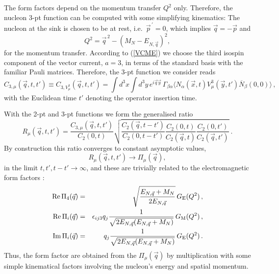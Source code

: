 \documentclass[11pt,prd,aps,showpacs,eqsecnum,floatfix,nofootinbib,preprint,tightenlines]{revtex4}
\newcommand{\pref}[1]{(\ref{#1})}
\newcommand{\GE}{G_{\rm E}}
\newcommand{\GM}{G_{\rm M}}
\begin{document}
The form factors depend on the momentum transfer $Q^2$ only. Therefore, the nucleon 3-pt function can be  computed with some simplifying kinematics: The nucleon at the sink is chosen to be at rest, i.e.\ $\vec{p}^{\,\prime}=0$, which implies $\vec{q}=-\vec{p}$ and 
\begin{equation}\label{DefQsqr}
Q^2=\vec{q}^{\,2} - (M_N-E_{N,\vec{q}})^2,
\end{equation}
for the momentum transfer. According to \pref{VCME}  we choose the third isospin component of the vector current, $a=3$, in terms of the standard basis with the familiar Pauli matrices. Therefore, the 3-pt function we consider reads
\begin{equation}\label{Def3ptfunc}
C_{3,{\mu}}(\vec{q},t,t')\equiv C_{3,V^3_{\mu}}(\vec{q},t,t')=\int d^3x\int d^3y \,e^{i\vec{q}\vec{y}}\, \Gamma_{\beta\alpha}\langle N_{\alpha}(\vec{x},t) V_{\mu}^3(\vec{y},t')\overline{N}_{\beta}(0,0)\rangle\,,
\end{equation}
with the Euclidean time $t'$ denoting the operator insertion time.

With the 2-pt and 3-pt functions we form the generalised ratio
\begin{equation}\label{DefRatio}
R_{\mu}(\vec{q},t,t') =\frac{C_{3,{\mu}}(\vec{q},t,t')}{C_2(0,t)}\sqrt{\frac{C_2(\vec{q},t-t')}{C_2(0,t-t')}\frac{C_2(0,t)}{C_2(\vec{q},t)}\frac{C_2(0,t')}{C_2(\vec{q},t')}} \ .
\end{equation}
By construction this ratio converges to constant asymptotic values,
\begin{equation}\label{Pimu}
R_{\mu}(\vec{q},t,t')  \longrightarrow \Pi_{{\mu}}(\vec{q}),
\end{equation}
in the limit $t,t', t-t'\rightarrow \infty$,
and these are trivially related to the electromagnetic form factors \cite{Capitani:2015sba,Jang:2019jkn}:
\begin{eqnarray}
{\rm Re}\,\Pi_{4}(\vec{q}) &=&  \sqrt{\frac{E_{N,\vec{q}}+M_N}{2E_{N,\vec{q}}}} \, \GE(Q^2)\,,\label{AsympValuePi4}\\
{\rm Re}\,\Pi_{i}(\vec{q}) &=& \epsilon_{ij3}  q_j\frac{1}{\sqrt{2 E_{N,\vec{q}}(E_{N,\vec{q}}+M_N)}}\, \GM(Q^2) \,,\label{AsympValueRePik}\\
{\rm Im}\,\Pi_{i}(\vec{q}) &=& q_j\frac{1}{\sqrt{2 E_{N,\vec{q}}(E_{N,\vec{q}}+M_N)}}\, \GE(Q^2) \,.\label{AsympValueImPik}
\end{eqnarray}
Thus, the form factor are obtained from the $\Pi_{{\mu}}(\vec{q})$ by multiplication with some simple kinematical factors involving the nucleon's energy and spatial momentum.
\end{document}
